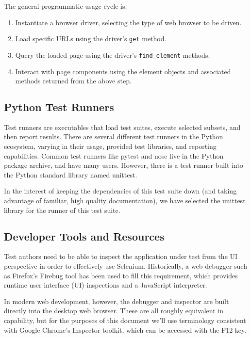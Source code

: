 The general programmatic usage cycle is:
\begin{enumerate}
\item Instantiate a browser driver, selecting the type of web browser to be driven.
\item Load specific URLs using the driver's \texttt{get} method.
\item Query the loaded page using the driver's \texttt{find\_element} methods.
\item Interact with page components using the element objects and associated methods returned from the above step.
\end{enumerate}\citep{artzi2011framework}

\subsection{Python Test Runners}
Test runners are executables that load test suites, execute selected subsets, and then report results. There are several different test runners in the Python ecosystem, varying in their usage, provided test libraries, and reporting capabilities. \citep{nielsen2014python} Common test runners like pytest and nose live in the Python package archive, and have many users. However, there is a test runner built into the Python standard library named unittest.\citep{pajankar2017python}

In the interest of keeping the dependencies of this test suite down (and taking advantage of familiar, high quality documentation), we have selected the unittest library for the runner of this test suite.

\subsection{Developer Tools and Resources}
Test authors need to be able to inspect the application under test from the UI perspective in order to effectively use Selenium. Historically, a web debugger such as Firefox's Firebug tool has been used to fill this requirement, which provides runtime user interface (UI) inspections and a JavaScript interpreter.\citep{nicholus2016understanding}

In modern web development, however, the debugger and inspector are built directly into the desktop web browser.\citep{odell2014browser} These are all roughly equivalent in capability, but for the purposes of this document we'll use terminology consistent with Google Chrome's Inspector toolkit, which can be accessed with the F12 key.

